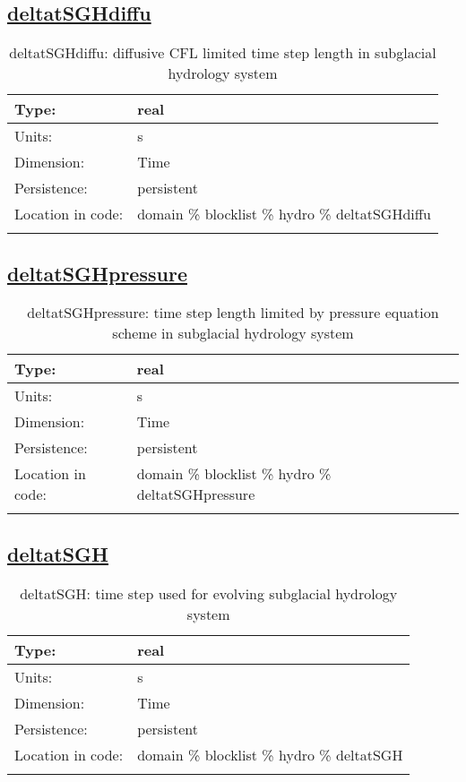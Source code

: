 \subsection[deltatSGHdiffu]{\hyperref[sec:var_tab_hydro]{deltatSGHdiffu}}
\label{subsec:var_sec_hydro_deltatSGHdiffu}
\begin{center}
\begin{longtable}{| p{2.0in} | p{4.0in} |}
        \hline 
        Type: & real \\
        \hline 
        Units: & \si{s} \\
        \hline 
        Dimension: & Time \\
        \hline 
        Persistence: & persistent \\
        \hline 
         Location in code: & domain \% blocklist \% hydro \% deltatSGHdiffu \\
         \hline 
    \caption{deltatSGHdiffu: diffusive CFL limited time step length in subglacial hydrology system}
\end{longtable}
\end{center}
\subsection[deltatSGHpressure]{\hyperref[sec:var_tab_hydro]{deltatSGHpressure}}
\label{subsec:var_sec_hydro_deltatSGHpressure}
\begin{center}
\begin{longtable}{| p{2.0in} | p{4.0in} |}
        \hline 
        Type: & real \\
        \hline 
        Units: & \si{s} \\
        \hline 
        Dimension: & Time \\
        \hline 
        Persistence: & persistent \\
        \hline 
         Location in code: & domain \% blocklist \% hydro \% deltatSGHpressure \\
         \hline 
    \caption{deltatSGHpressure: time step length limited by pressure equation scheme in subglacial hydrology system}
\end{longtable}
\end{center}
\subsection[deltatSGH]{\hyperref[sec:var_tab_hydro]{deltatSGH}}
\label{subsec:var_sec_hydro_deltatSGH}
\begin{center}
\begin{longtable}{| p{2.0in} | p{4.0in} |}
        \hline 
        Type: & real \\
        \hline 
        Units: & \si{s} \\
        \hline 
        Dimension: & Time \\
        \hline 
        Persistence: & persistent \\
        \hline 
         Location in code: & domain \% blocklist \% hydro \% deltatSGH \\
         \hline 
    \caption{deltatSGH: time step used for evolving subglacial hydrology system}
\end{longtable}
\end{center}
